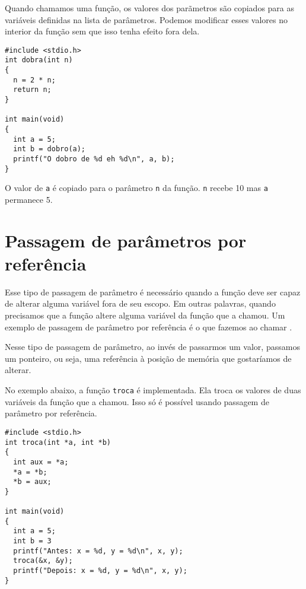 Quando chamamos uma função, os valores dos parãmetros são copiados para as variáveis definidas na lista de parâmetros. Podemos modificar esses valores no interior da função sem que isso tenha efeito fora dela.

\begin{lstlisting}
#include <stdio.h>
int dobra(int n)
{
  n = 2 * n;
  return n;
}

int main(void)
{
  int a = 5;
  int b = dobro(a);
  printf("O dobro de %d eh %d\n", a, b);
}
\end{lstlisting}

O valor de {\tt a} é copiado para o parâmetro {\tt n} da função. {\tt n} recebe 10 mas {\tt a} permanece 5.


\section{Passagem de parâmetros por referência}

Esse tipo de passagem de parâmetro é necessário quando a função deve ser capaz de alterar alguma variável fora de seu escopo. Em outras palavras, quando precisamos que a função altere alguma variável da função que a chamou. Um exemplo de passagem de parâmetro por referência é o que fazemos ao chamar \SCANF.

Nesse tipo de passagem de parâmetro, ao invés de passarmos um valor, passamos um ponteiro, ou seja, uma referência à posição de memória que gostaríamos de alterar.

No exemplo abaixo, a função {\tt troca} é implementada. Ela troca os valores de duas variáveis da função que a chamou. Isso só é possível usando passagem de parâmetro por referência.

\begin{lstlisting}
#include <stdio.h>
int troca(int *a, int *b)
{
  int aux = *a;
  *a = *b;
  *b = aux;
}

int main(void)
{
  int a = 5;
  int b = 3
  printf("Antes: x = %d, y = %d\n", x, y);
  troca(&x, &y);
  printf("Depois: x = %d, y = %d\n", x, y);
}
\end{lstlisting}


